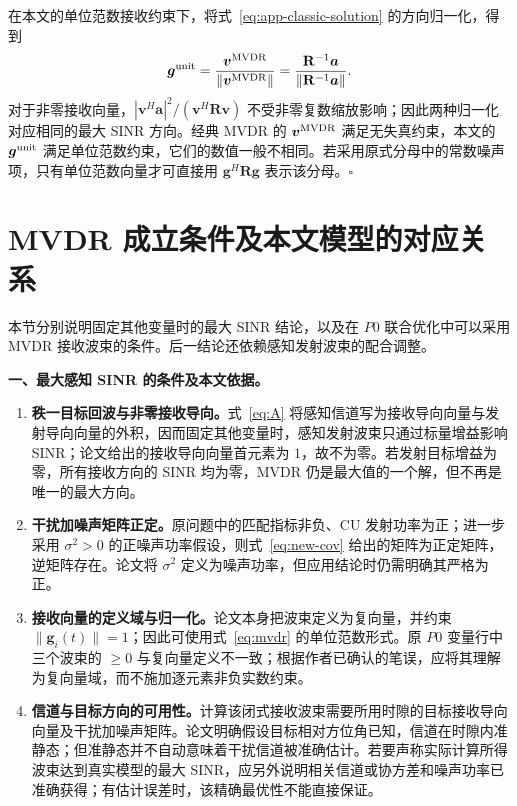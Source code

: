 \documentclass[11pt,a4paper]{ctexart}
\begin{document}
在本文的单位范数接收约束下，将式~\eqref{eq:app-classic-solution} 的方向归一化，得到
\begin{equation}\label{eq:app-unit-norm}
\bm g^{\rm unit}=\frac{\bm v^{\rm MVDR}}{\|\bm v^{\rm MVDR}\|}
=\frac{\mathbf R^{-1}\bm a}{\|\mathbf R^{-1}\bm a\|}.
\end{equation}
对于非零接收向量，$|\bm v^H\bm a|^2/(\bm v^H\mathbf R\bm v)$ 不受非零复数缩放影响；因此两种归一化对应相同的最大 SINR 方向。经典 MVDR 的 $\bm v^{\rm MVDR}$ 满足无失真约束，本文的 $\bm g^{\rm unit}$ 满足单位范数约束，它们的数值一般不相同。若采用原式分母中的常数噪声项，只有单位范数向量才可直接用 $\bm g^H\mathbf R\bm g$ 表示该分母。\hfill$\square$

\clearpage
\section{MVDR 成立条件及本文模型的对应关系}\label{app:conditions}
本节分别说明固定其他变量时的最大 SINR 结论，以及在 $P0$ 联合优化中可以采用 MVDR 接收波束的条件。后一结论还依赖感知发射波束的配合调整。

\noindent\textbf{一、最大感知 SINR 的条件及本文依据。}
\begin{enumerate}[label=\textbf{(\arabic*)},leftmargin=*]
\item \textbf{秩一目标回波与非零接收导向。}式~\eqref{eq:A} 将感知信道写为接收导向向量与发射导向向量的外积，因而固定其他变量时，感知发射波束只通过标量增益影响 SINR；论文给出的接收导向向量首元素为 $1$，故不为零。若发射目标增益为零，所有接收方向的 SINR 均为零，MVDR 仍是最大值的一个解，但不再是唯一的最大方向。
\item \textbf{干扰加噪声矩阵正定。}原问题中的匹配指标非负、CU 发射功率为正；进一步采用 $\sigma^2>0$ 的正噪声功率假设，则式~\eqref{eq:new-cov} 给出的矩阵为正定矩阵，逆矩阵存在。论文将 $\sigma^2$ 定义为噪声功率，但应用结论时仍需明确其严格为正。
\item \textbf{接收向量的定义域与归一化。}论文本身把波束定义为复向量，并约束 $\|\bm g_i(t)\|=1$；因此可使用式~\eqref{eq:mvdr} 的单位范数形式。原 $P0$ 变量行中三个波束的 $\ge0$ 与复向量定义不一致；根据作者已确认的笔误，应将其理解为复向量域，而不施加逐元素非负实数约束。
\item \textbf{信道与目标方向的可用性。}计算该闭式接收波束需要所用时隙的目标接收导向向量及干扰加噪声矩阵。论文明确假设目标相对方位角已知，信道在时隙内准静态；但准静态并不自动意味着干扰信道被准确估计。若要声称实际计算所得波束达到真实模型的最大 SINR，应另外说明相关信道或协方差和噪声功率已准确获得；有估计误差时，该精确最优性不能直接保证。
\end{enumerate}
\end{document}
